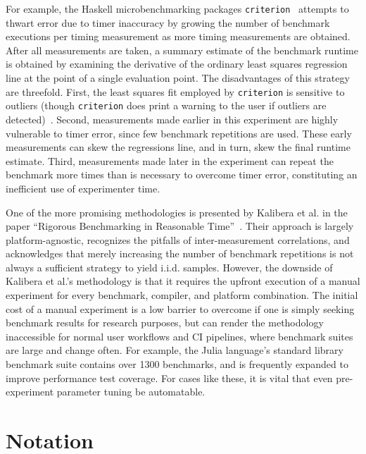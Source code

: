 \documentclass[conference]{IEEEtran}
\begin{document}
For example, the Haskell microbenchmarking packages \lstinline|criterion|~\cite{criterion}
attempts to thwart error due to timer inaccuracy by growing the number of benchmark
executions per timing measurement as more timing measurements are obtained. After all
measurements are taken, a summary estimate of the benchmark runtime is obtained by examining
the derivative of the ordinary least squares regression line at the point of a single
evaluation point. The disadvantages of this strategy are threefold. First, the least squares
fit employed by \lstinline|criterion| is sensitive to outliers (though \lstinline|criterion|
does print a warning to the user if outliers are detected)~\cite{Maronna2006}. Second,
measurements made earlier in this experiment are highly vulnerable to timer error, since few
benchmark repetitions are used. These early measurements can skew the regressions line, and
in turn, skew the final runtime estimate. Third, measurements made later in the experiment
can repeat the benchmark more times than is necessary to overcome timer error, constituting
an inefficient use of experimenter time.

One of the more promising methodologies is presented by Kalibera et al. in the paper
``Rigorous Benchmarking in Reasonable Time''~\cite{Kalibera2013}. Their approach is largely
platform-agnostic, recognizes the pitfalls of inter-measurement correlations, and
acknowledges that merely increasing the number of benchmark repetitions is not always a
sufficient strategy to yield i.i.d. samples. However, the downside of Kalibera et al.'s
methodology is that it requires the upfront execution of a manual experiment for every
benchmark, compiler, and platform combination. The initial cost of a manual experiment is a
low barrier to overcome if one is simply seeking benchmark results for research purposes,
but can render the methodology inaccessible for normal user workflows and CI pipelines,
where benchmark suites are large and change often. For example, the Julia language's
standard library benchmark suite contains over 1300 benchmarks, and is frequently expanded
to improve performance test coverage. For cases like these, it is vital that even
pre-experiment parameter tuning be automatable.

\section{Notation}
\label{sec:notation}
\end{document}
